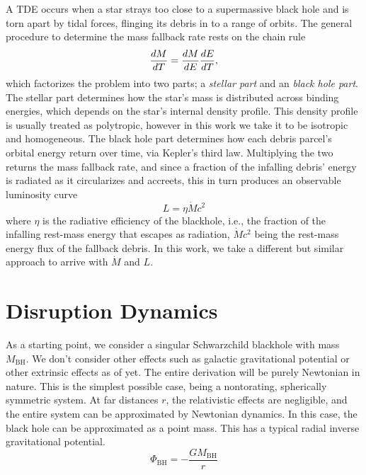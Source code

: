\documentclass[10pt,a4paper]{article}
\begin{document}
		A TDE occurs when a star strays too close to a supermassive black hole and is torn
		apart by tidal forces, flinging its debris in to a range of orbits. The general
		procedure to determine the mass fallback rate rests on the chain rule
		\begin{equation}
			\label{eq:fallbackrate}
			\dv{M}{T} = \dv{M}{E} \dv{E}{T},
		\end{equation}
		which factorizes the problem into two parts; a \textit{stellar part} and an \textit{black hole part}. 
		The stellar part determines how the star's mass is distributed across binding energies, which
		depends on the star's internal density profile. This density profile is usually treated as
		polytropic, however in this work we take it to be isotropic and homogeneous. The black hole part determines 
		how each debris parcel's orbital energy return over time, via Kepler's third law. Multiplying 
		the two returns the mass fallback rate, and since a fraction of the infalling debris' energy
		is radiated as it circularizes and accreets, this in turn produces an observable luminosity curve 
		\begin{equation}
			\label{eq:luminositycurve}
			L = \eta \dot M c^2
		\end{equation}
		where $\eta$ is the radiative efficiency of the blackhole, i.e., the fraction of the infalling 
		rest-mass energy that escapes as radiation, $\dot M c^2$ being the rest-mass energy flux of the fallback debris.
		In this work, we take a different but similar approach to arrive with $\dot M$ and $L$.

	\section{Disruption Dynamics}
		As a starting point, we consider a singular Schwarzchild blackhole with mass $M_\text{BH}$.
		We don't consider other effects such as galactic gravitational potential or other extrinsic effects as of yet. 
		The entire derivation will be purely Newtonian in nature.
		This is the simplest possible case, being a nontorating, spherically symmetric system. 
		At far distances $r$, the relativistic effects are negligible, and the entire system can
		be approximated by Newtonian dynamics. In this case, the black hole can be approximated as a point mass.
		This has a typical radial inverse gravitational potential.
		\begin{equation}
			\label{eq:potentialbh}
			\Phi_\text{BH} = - \frac{GM_\text{BH}}{r} 
		\end{equation}
\end{document}

